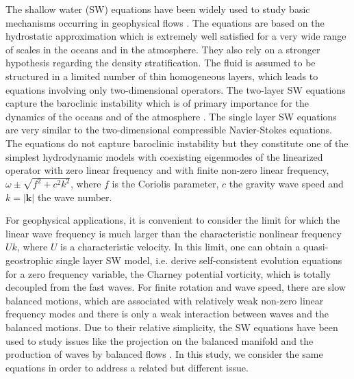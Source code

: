 \documentclass{jfm}
\newcommand{\kk}{\textbf{k}}
\begin{document}
The shallow water (SW) equations  have been widely used to study basic
mechanisms occurring in geophysical flows \cite[see for
example][]{VallisLIVRE2006}.
%
The equations are based on the hydrostatic approximation which is
extremely well satisfied for a very wide range of scales in the oceans
and in the atmosphere.  They also rely on a stronger hypothesis
regarding the density stratification.  The fluid is assumed to be
structured in a limited number of thin homogeneous layers, which leads
to equations involving only two-dimensional operators. The two-layer
SW equations capture the baroclinic instability which is of
primary importance for the dynamics of the oceans and of the
atmosphere \cite[]{VallisLIVRE2006, Wirth2013}.
%
The single layer SW equations are very similar to
the two-dimensional compressible Navier-Stokes equations.  The
equations do not capture baroclinic instability but they constitute 
one of the simplest hydrodynamic models with coexisting eigenmodes of
the linearized operator with zero linear frequency and with finite
non-zero linear frequency, $\omega  \pm\sqrt{f^2 + c^2
k^2}$, where $f$ is the Coriolis parameter, $c$ the gravity wave speed and $k
= |\kk|$ the wave number.
%

For geophysical applications, it is convenient to consider the limit
for which the linear wave frequency  is much larger than the
characteristic nonlinear frequency $ U k$, where $U$ is a
characteristic velocity.  In this limit, one can obtain a quasi-geostrophic
single layer SW model, i.e. derive self-consistent evolution
equations for a zero frequency variable, the Charney potential
vorticity, which is totally decoupled from the fast waves.
%
For finite rotation and wave speed, there are slow balanced motions,
which are associated with relatively weak non-zero linear frequency
modes and there is only a weak
interaction between waves and the balanced motions.
%
Due to their relative simplicity, the SW equations have
been used to study issues like the projection on the balanced manifold
\cite[]{Lorenz1980, MohebalhojehDritschel2000} and the production of
waves by balanced flows \cite[]{FargeSadourny1989,
LahayeZeitlin2012,Vanneste2013}. 
In this study, we consider the
same equations in order to address a related but different issue.
\end{document}
